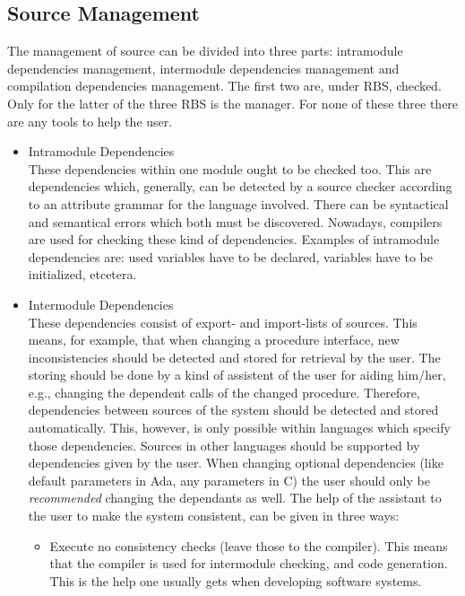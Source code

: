 \subsection{Source Management}
 The management of source can be divided into three parts: intramodule 
 dependencies management, intermodule dependencies management and compilation 
 dependencies management. The first two are, under RBS, checked. Only for the 
 latter of the three RBS is the manager. For none of these three there are any
 tools to help the user.
 \begin{itemize}
   \item Intramodule Dependencies\\
    These dependencies within one module ought to be checked too. This are 
    dependencies which, generally, can be detected by a source checker 
    according to an attribute grammar for the language involved. There can be 
    syntactical and semantical errors which both must be discovered. Nowadays, 
    compilers are used for checking these kind of dependencies. Examples 
    of intramodule dependencies are: used variables have to be declared, 
    variables have to be initialized, etcetera.
   \item Intermodule Dependencies\\
    These dependencies consist of export- and import-lists of sources. This 
    means, for example, that when changing a procedure interface, new 
    inconsistencies should be detected and stored for retrieval by the user. 
    The storing should be done by a kind of assistent of the user for aiding 
    him/her, e.g., changing the dependent calls of the changed procedure. 
    Therefore, 
    dependencies between sources of the system should be detected and stored 
    automatically. This, however, is only possible within languages which 
    specify those dependencies. Sources in other languages should be supported 
    by dependencies given by the user. When changing optional dependencies 
    (like default parameters in Ada, any parameters in C) the user should only 
    be {\em recommended}\/ changing the dependants as well. The help of the 
    assistant to the user to make the system consistent, can be given in three 
    ways:
    \begin{itemize}
      \item Execute no consistency checks (leave those to the compiler).
            This means that the compiler is used for intermodule checking,
            and code generation. This is the help one usually gets when 
            developing software systems. 

\end{itemize}
\end{itemize}
